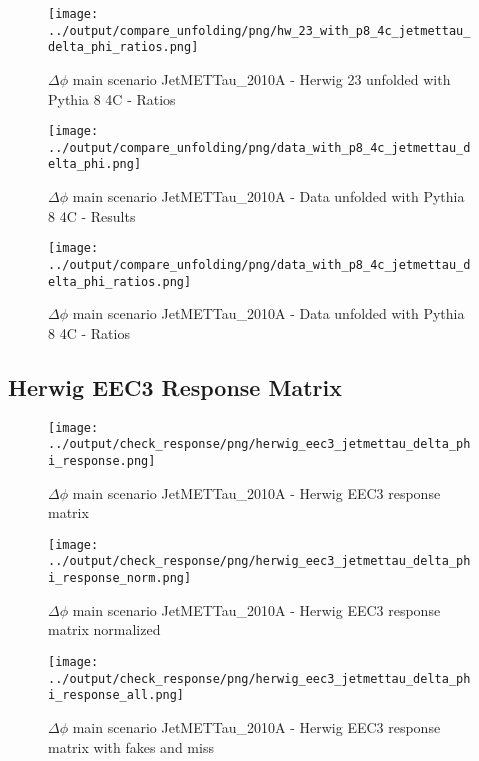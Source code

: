\documentclass[11pt]{book}
\begin{document}
\begin{figure}[ht]
\centering
\texttt{[image: ../output/compare\_unfolding/png/hw\_23\_with\_p8\_4c\_jetmettau\_delta\_phi\_ratios.png]}
\caption{$\Delta\phi$ main scenario JetMETTau\_2010A - Herwig 23 unfolded with Pythia 8 4C - Ratios}
\label{hw_23_p8_jetmettau_delta_phi_b}
\end{figure}

\begin{figure}[ht]
\centering
\texttt{[image: ../output/compare\_unfolding/png/data\_with\_p8\_4c\_jetmettau\_delta\_phi.png]}
\caption{$\Delta\phi$ main scenario JetMETTau\_2010A - Data unfolded with Pythia 8 4C - Results}
\label{data_p8_jetmettau_delta_phi_a}
\end{figure}

\begin{figure}[ht]
\centering
\texttt{[image: ../output/compare\_unfolding/png/data\_with\_p8\_4c\_jetmettau\_delta\_phi\_ratios.png]}
\caption{$\Delta\phi$ main scenario JetMETTau\_2010A - Data unfolded with Pythia 8 4C - Ratios}
\label{data_p8_jetmettau_delta_phi_b}
\end{figure}

\clearpage
\subsection{Herwig EEC3 Response Matrix}

\begin{figure}[ht]
\centering
\texttt{[image: ../output/check\_response/png/herwig\_eec3\_jetmettau\_delta\_phi\_response.png]}
\caption{$\Delta\phi$ main scenario JetMETTau\_2010A - Herwig EEC3 response matrix}
\label{hw_eec3_jetmettau_delta_phi_response}
\end{figure}

\begin{figure}[ht]
\centering
\texttt{[image: ../output/check\_response/png/herwig\_eec3\_jetmettau\_delta\_phi\_response\_norm.png]}
\caption{$\Delta\phi$ main scenario JetMETTau\_2010A - Herwig EEC3 response matrix normalized}
\label{hw_eec3_jetmettau_delta_phi_response_norm}
\end{figure}

\begin{figure}[ht]
\centering
\texttt{[image: ../output/check\_response/png/herwig\_eec3\_jetmettau\_delta\_phi\_response\_all.png]}
\caption{$\Delta\phi$ main scenario JetMETTau\_2010A - Herwig EEC3 response matrix with fakes and miss}
\label{hw_eec3_jetmettau_delta_phi_response_all}
\end{figure}
\end{document}
